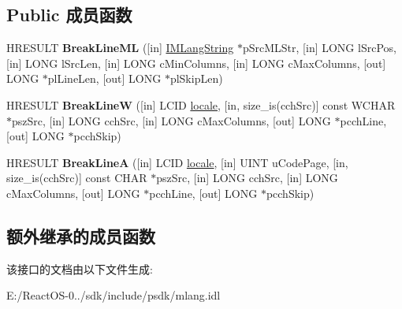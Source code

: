 \subsection*{Public 成员函数}
\begin{DoxyCompactItemize}
\item 
\mbox{\label{interface_multi_language_1_1_i_m_lang_line_break_console_aa3d81ace0a26de8c46d8b2102bc3534b}} 
H\+R\+E\+S\+U\+LT {\bfseries Break\+Line\+ML} (\mbox{[}in\mbox{]} \hyperlink{interface_multi_language_1_1_i_m_lang_string}{I\+M\+Lang\+String} $\ast$p\+Src\+M\+L\+Str, \mbox{[}in\mbox{]} L\+O\+NG l\+Src\+Pos, \mbox{[}in\mbox{]} L\+O\+NG l\+Src\+Len, \mbox{[}in\mbox{]} L\+O\+NG c\+Min\+Columns, \mbox{[}in\mbox{]} L\+O\+NG c\+Max\+Columns, \mbox{[}out\mbox{]} L\+O\+NG $\ast$pl\+Line\+Len, \mbox{[}out\mbox{]} L\+O\+NG $\ast$pl\+Skip\+Len)
\item 
\mbox{\label{interface_multi_language_1_1_i_m_lang_line_break_console_a61065857ccd7375876e6f34aa59a212b}} 
H\+R\+E\+S\+U\+LT {\bfseries Break\+LineW} (\mbox{[}in\mbox{]} L\+C\+ID \hyperlink{classlocale}{locale}, \mbox{[}in, size\+\_\+is(cch\+Src)\mbox{]} const W\+C\+H\+AR $\ast$psz\+Src, \mbox{[}in\mbox{]} L\+O\+NG cch\+Src, \mbox{[}in\mbox{]} L\+O\+NG c\+Max\+Columns, \mbox{[}out\mbox{]} L\+O\+NG $\ast$pcch\+Line, \mbox{[}out\mbox{]} L\+O\+NG $\ast$pcch\+Skip)
\item 
\mbox{\label{interface_multi_language_1_1_i_m_lang_line_break_console_a1f757f9a3526f9b0cffdd8a35ef480fb}} 
H\+R\+E\+S\+U\+LT {\bfseries Break\+LineA} (\mbox{[}in\mbox{]} L\+C\+ID \hyperlink{classlocale}{locale}, \mbox{[}in\mbox{]} U\+I\+NT u\+Code\+Page, \mbox{[}in, size\+\_\+is(cch\+Src)\mbox{]} const C\+H\+AR $\ast$psz\+Src, \mbox{[}in\mbox{]} L\+O\+NG cch\+Src, \mbox{[}in\mbox{]} L\+O\+NG c\+Max\+Columns, \mbox{[}out\mbox{]} L\+O\+NG $\ast$pcch\+Line, \mbox{[}out\mbox{]} L\+O\+NG $\ast$pcch\+Skip)
\end{DoxyCompactItemize}
\subsection*{额外继承的成员函数}


该接口的文档由以下文件生成\+:\begin{DoxyCompactItemize}
\item 
E\+:/\+React\+O\+S-\/0../sdk/include/psdk/mlang.\+idl\end{DoxyCompactItemize}
